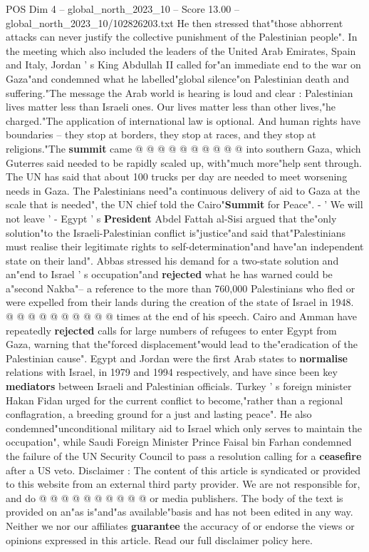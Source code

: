 \begin{textsample}{POS Dim 4 – global\_north\_2023\_10 – Score 13.00 – global\_north\_2023\_10/102826203.txt}
He then stressed that"those abhorrent attacks can never justify the collective punishment of the Palestinian people".
In the meeting which also included the leaders of the United Arab Emirates, Spain and Italy, Jordan ' s King Abdullah II called for"an immediate end to the war on Gaza"and condemned what he labelled"global silence"on Palestinian death and suffering."The message the Arab world is hearing is loud and clear : Palestinian lives matter less than Israeli ones.
Our lives matter less than other lives,"he charged."The application of international law is optional.
And human rights have boundaries -- they stop at borders, they stop at races, and they stop at religions."The \textbf{summit} came @ @ @ @ @ @ @ @ @ @ into southern Gaza, which Guterres said needed to be rapidly scaled up, with"much more"help sent through.
The UN has said that about 100 trucks per day are needed to meet worsening needs in Gaza.
The Palestinians need"a continuous delivery of aid to Gaza at the scale that is needed", the UN chief told the Cairo"\textbf{Summit} for Peace". - ' We will not leave ' - Egypt ' s \textbf{President} Abdel Fattah al-Sisi argued that the"only solution"to the Israeli-Palestinian conflict is"justice"and said that"Palestinians must realise their legitimate rights to self-determination"and have"an independent state on their land".
Abbas stressed his demand for a two-state solution and an"end to Israel ' s occupation"and \textbf{rejected} what he has warned could be a"second Nakba"-- a reference to the more than 760,000 Palestinians who fled or were expelled from their lands during the creation of the state of Israel in 1948. @ @ @ @ @ @ @ @ @ @ times at the end of his speech.
Cairo and Amman have repeatedly \textbf{rejected} calls for large numbers of refugees to enter Egypt from Gaza, warning that the"forced displacement"would lead to the"eradication of the Palestinian cause".
Egypt and Jordan were the first Arab states to \textbf{normalise} relations with Israel, in 1979 and 1994 respectively, and have since been key \textbf{mediators} between Israeli and Palestinian officials.
Turkey ' s foreign minister Hakan Fidan urged for the current conflict to become,"rather than a regional conflagration, a breeding ground for a just and lasting peace".
He also condemned"unconditional military aid to Israel which only serves to maintain the occupation", while Saudi Foreign Minister Prince Faisal bin Farhan condemned the failure of the UN Security Council to pass a resolution calling for a \textbf{ceasefire} after a US veto.
Disclaimer : The content of this article is syndicated or provided to this website from an external third party provider.
We are not responsible for, and do @ @ @ @ @ @ @ @ @ @ or media publishers.
The body of the text is provided on an"as is"and"as available"basis and has not been edited in any way.
Neither we nor our affiliates \textbf{guarantee} the accuracy of or endorse the views or opinions expressed in this article.
Read our full disclaimer policy here.

\end{textsample}
